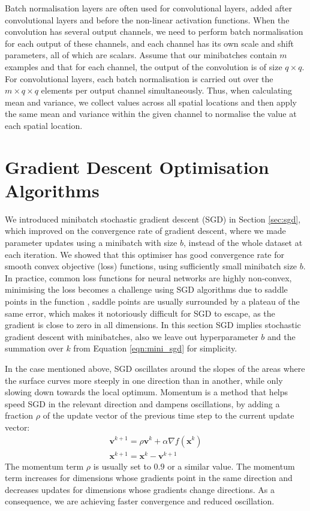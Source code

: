 \documentclass[12pt]{report}
\numberwithin{equation}{section}
\begin{document}
Batch normalisation layers are often used for convolutional layers, added after convolutional layers and before the non-linear activation functions. When the convolution has several output channels, we need to perform batch normalisation for each output of these channels, and each channel has its own scale and shift parameters, all of which are scalars. Assume that our minibatches contain $m$ examples and that for each channel, the output of the convolution is of size $q \times q$. For convolutional layers, each batch normalisation is carried out over the $m \times q \times q$ elements per output channel simultaneously. Thus, when calculating mean and variance, we collect values across all spatial locations and then apply the same mean and variance within the given channel to normalise the value at each spatial location.


\section{Gradient Descent Optimisation Algorithms}
We introduced minibatch stochastic gradient descent (SGD) in Section \ref{sec:sgd}, which improved on the convergence rate of gradient descent, where we made parameter updates using a minibatch with size $b$, instead of the whole dataset at each iteration. We showed that this optimiser has good convergence rate for smooth convex objective (loss) functions, using sufficiently small minibatch size $b$. In practice, common loss functions for neural networks are highly non-convex, minimising the loss becomes a challenge using SGD algorithms due to saddle points in the function \textbf{\cite{dauphin17e}}, saddle points are usually surrounded by a plateau of the same error, which makes it notoriously difficult for SGD to escape, as the gradient is close to zero in all dimensions. In this section SGD implies stochastic gradient descent with minibatches, also we leave out hyperparameter $b$ and the summation over $k$ from Equation \ref{eqn:mini_sgd} for simplicity.

In the case mentioned above, SGD oscillates around the slopes of the areas where the surface curves more steeply in one direction than in another, while only slowing down towards the local optimum. Momentum \textbf{\cite{qian1999momentum}} is a method that helps speed SGD in the relevant direction and dampens oscillations, by adding a fraction $\rho$ of the update vector of the previous time step to the current update vector:
\begin{equation}
\begin{array}{l}\label{eqn:momentum}
\bm{v}^{k+1}=\rho \bm{v}^{k}+ \alpha \nabla f(\bm{x}^{k}) \\
\bm{x}^{k+1} = \bm{x}^{k}- \bm{v}^{k+1}
\end{array}
\end{equation} \noindent
The momentum term $\rho$ is usually set to $0.9$ or a similar value. The momentum term increases for dimensions whose gradients point in the same direction and decreases updates for dimensions whose gradients change directions. As a consequence, we are achieving faster convergence and reduced oscillation.
\end{document}
